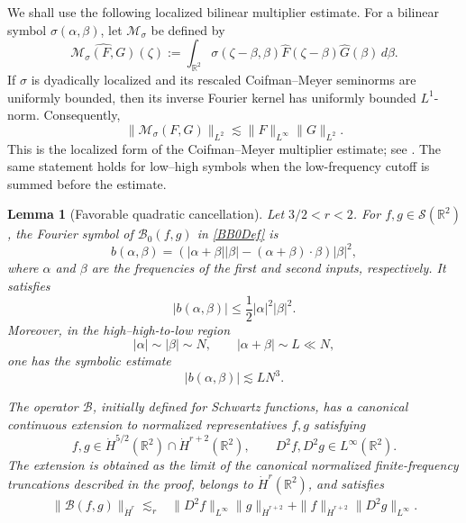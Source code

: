 \documentclass[12pt]{amsart}
\newtheorem{lemma}[theorem]{Lemma}
\theoremstyle{remark}
\theoremstyle{definition}
\numberwithin{equation}{section}
\newcommand{\R}{\mathbb{R}}
\begin{document}
We shall use the following localized bilinear multiplier estimate.
For a bilinear symbol \(\sigma(\alpha,\beta)\), let
\(\mathcal M_\sigma\) be defined by
\[
 \widehat{\mathcal M_\sigma(F,G)}(\zeta)
 :=
 \int_{\R^2}
 \sigma(\zeta-\beta,\beta)
 \widehat F(\zeta-\beta)
 \widehat G(\beta)\,d\beta.
\]
If \(\sigma\) is dyadically localized and its rescaled
Coifman--Meyer seminorms are uniformly bounded, then its inverse
Fourier kernel has uniformly bounded \(L^1\)-norm.  Consequently,
\begin{equation*}
 \|\mathcal M_\sigma(F,G)\|_{L^2} \lesssim \|F\|_{L^\infty}\|G\|_{L^2}.
\end{equation*}
This is the localized form of the Coifman--Meyer multiplier estimate; see \cite{CM78}.  
The same statement holds for low--high symbols when the
low-frequency cutoff is summed before the estimate.

\begin{lemma}[Favorable quadratic cancellation]\label{lem:quadratic-cancellation-revised}
Let \(3/2<r<2\).
For \(f,g\in\mathcal S(\R^2)\), the Fourier symbol of
\(\mathcal{B}_0(f,g)\) in \eqref{BB0Def} is
\begin{equation*}
 b(\alpha,\beta) = \left( |\alpha+\beta||\beta| -(\alpha+\beta)\cdot\beta \right)|\beta|^2,
\end{equation*}
where \(\alpha\) and \(\beta\) are the frequencies of the first and second inputs, respectively.
It satisfies
\begin{equation*}
 |b(\alpha,\beta)| \leq \frac12|\alpha|^2|\beta|^2.
\end{equation*}
Moreover, in the high--high-to-low region
\[
 |\alpha|\sim|\beta|\sim N, \qquad |\alpha+\beta|\sim L\ll N,
\]
one has the symbolic estimate
\begin{equation*}
 |b(\alpha,\beta)| \lesssim LN^3.
\end{equation*}

The operator \(\mathcal B\), initially defined for Schwartz functions, has a canonical continuous extension to normalized representatives \(f,g\) satisfying
\[
	 f,g\in\dot H^{5/2}(\R^2)\cap\dot H^{r+2}(\R^2), \qquad D^2f,D^2g\in L^\infty(\R^2).
\]
The extension is obtained as the limit of the canonical normalized finite-frequency truncations described in the proof, belongs to \(\dot H^r(\R^2)\), and satisfies
\begin{align}\label{eq:B-estimate-revised}
 \|\mathcal B(f,g)\|_{\dot H^r}
 \lesssim_r{}&
 \|D^2f\|_{L^\infty}
 \|g\|_{\dot H^{r+2}}
 +
 \|f\|_{\dot H^{r+2}}
 \|D^2g\|_{L^\infty}.
\end{align}
\end{lemma}
\end{document}
